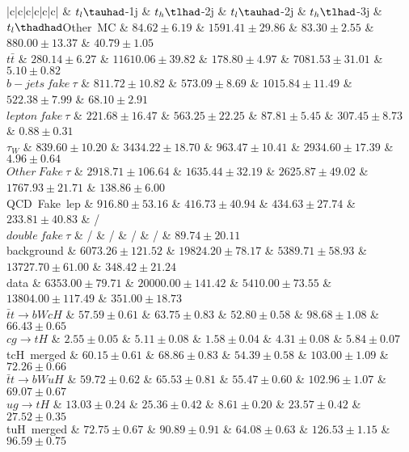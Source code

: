 \centering
\begin{tabular}{|c|c|c|c|c|c|} \toprule\toprule
 & $t_{l}\tauhad$-1j & $t_{h}\tlhad$-2j & $t_{l}\tauhad$-2j & $t_{h}\tlhad$-3j & $t_{l}\thadhad$Other~MC & $84.62\pm6.19$ & $1591.41\pm29.86$ & $83.30\pm2.55$ & $880.00\pm13.37$ & $40.79\pm1.05$\\
$t\bar{t}$ & $280.14\pm6.27$ & $11610.06\pm39.82$ & $178.80\pm4.97$ & $7081.53\pm31.01$ & $5.10\pm0.82$\\
$b-jets~fake~\tau$ & $811.72\pm10.82$ & $573.09\pm8.69$ & $1015.84\pm11.49$ & $522.38\pm7.99$ & $68.10\pm2.91$\\
$lepton~fake~\tau$ & $221.68\pm16.47$ & $563.25\pm22.25$ & $87.81\pm5.45$ & $307.45\pm8.73$ & $0.88\pm0.31$\\
$\tau_{W}$ & $839.60\pm10.20$ & $3434.22\pm18.70$ & $963.47\pm10.41$ & $2934.60\pm17.39$ & $4.96\pm0.64$\\
$Other~Fake~\tau$ & $2918.71\pm106.64$ & $1635.44\pm32.19$ & $2625.87\pm49.02$ & $1767.93\pm21.71$ & $138.86\pm6.00$\\
QCD~Fake~lep & $916.80\pm53.16$ & $416.73\pm40.94$ & $434.63\pm27.74$ & $233.81\pm40.83$ &  /\\
$double~fake~\tau$ &  / &  / &  / &  / & $89.74\pm20.11$\\
background & $6073.26\pm121.52$ & $19824.20\pm78.17$ & $5389.71\pm58.93$ & $13727.70\pm61.00$ & $348.42\pm21.24$\\
data & $6353.00\pm79.71$ & $20000.00\pm141.42$ & $5410.00\pm73.55$ & $13804.00\pm117.49$ & $351.00\pm18.73$\\
$\bar{t}t\to bWcH$ & $57.59\pm0.61$ & $63.75\pm0.83$ & $52.80\pm0.58$ & $98.68\pm1.08$ & $66.43\pm0.65$\\
$cg\to tH$ & $2.55\pm0.05$ & $5.11\pm0.08$ & $1.58\pm0.04$ & $4.31\pm0.08$ & $5.84\pm0.07$\\
tcH~merged & $60.15\pm0.61$ & $68.86\pm0.83$ & $54.39\pm0.58$ & $103.00\pm1.09$ & $72.26\pm0.66$\\
$\bar{t}t\to bWuH$ & $59.72\pm0.62$ & $65.53\pm0.81$ & $55.47\pm0.60$ & $102.96\pm1.07$ & $69.07\pm0.67$\\
$ug\to tH$ & $13.03\pm0.24$ & $25.36\pm0.42$ & $8.61\pm0.20$ & $23.57\pm0.42$ & $27.52\pm0.35$\\
tuH~merged & $72.75\pm0.67$ & $90.89\pm0.91$ & $64.08\pm0.63$ & $126.53\pm1.15$ & $96.59\pm0.75$\\
\bottomrule\bottomrule\\
\end{tabular}
